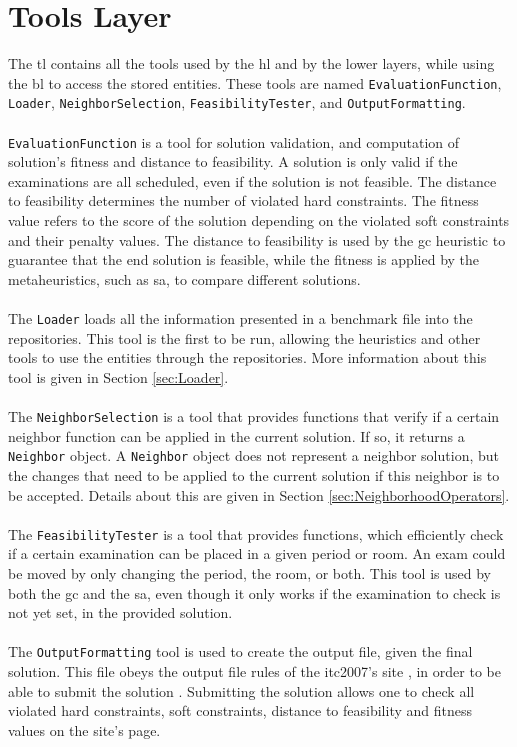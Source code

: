 \section{Tools Layer}
\label{subsec:ToolsLayer}
The \gls{tl} contains all the tools used by the \gls{hl} and by the lower layers, while using the \gls{bl} to access the stored entities. These tools are named \verb+EvaluationFunction+, \verb+Loader+, \verb+NeighborSelection+, \verb+FeasibilityTester+, and \verb+OutputFormatting+.\\
\\
\verb+EvaluationFunction+ is a tool  for solution validation, and computation of solution's fitness and distance to feasibility. A solution is only valid if the examinations are all scheduled, even if the solution is not feasible. The distance to feasibility determines the number of violated hard constraints. The fitness value refers to the score of the solution depending on the violated soft constraints and their penalty values. The distance to feasibility is used by the \gls{gc} heuristic to guarantee that the end solution is feasible, while the fitness is applied by the metaheuristics, such as \gls{sa}, to compare different solutions.\\
\\
The \verb+Loader+ loads all the information presented in a benchmark file into the repositories. This tool is the first to be run, allowing the heuristics and other tools to use the entities through the repositories. More information about this tool is given in Section \ref{sec:Loader}.\\
\\
The \verb+NeighborSelection+ is a tool that provides functions that verify if a certain neighbor function can be applied in the current solution. If so, it returns a \verb+Neighbor+ object. A \verb+Neighbor+ object does not represent a neighbor solution, but the changes that need to be applied to the current solution if this neighbor is to be accepted. Details about this are given in Section \ref{sec:NeighborhoodOperators}.\\
\\
The \verb+FeasibilityTester+ is a tool that provides functions, which efficiently check if a certain examination can be placed in a given period or room. An exam could be moved by only changing the period, the room, or both. This tool is used by both the \gls{gc} and the \gls{sa}, even though it only works if the examination to check is not yet set, in the provided solution.\\
\\
The \verb+OutputFormatting+ tool is used to create the output file, given the final solution. This file obeys the output file rules of the \gls{itc2007}'s site \cite{McCollum2007b}, in order to be able to submit the solution \cite{McCollum2007c}. Submitting the solution allows one to check all violated hard constraints, soft constraints, distance to feasibility and fitness values on the site's page.

